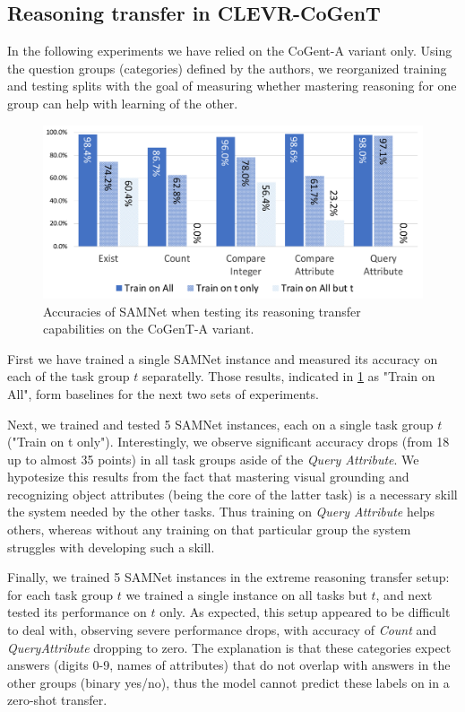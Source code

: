 \subsection{Reasoning transfer in CLEVR-CoGenT}
\label{sec:reasoning-transfer-clevr}
In the following experiments we have relied on the CoGent-A variant only.
Using the question groups (categories) defined by the authors, we reorganized training and testing splits with the goal of measuring whether mastering reasoning for one group can help with learning of the other.

\begin{figure}[htbp]
	\centering
	\includegraphics[width=\columnwidth]{../img/plots/cogent_reasoning_transfer.pdf}
	\caption{Accuracies of SAMNet when testing its reasoning transfer capabilities on the CoGenT-A variant.}
	\label{fig:cogent_reasoning_transfer}
\end{figure}

First we have trained a single SAMNet instance and measured its accuracy on each of the task group $t$ separatelly.
Those results, indicated in \cref{fig:cogent_reasoning_transfer} as "Train on All", form baselines for the next two sets of experiments.

Next, we trained and tested 5 SAMNet instances, each on a single task group $t$ ("Train on t only").
Interestingly, we observe significant accuracy drops (from 18 up to almost 35 points) in all task groups aside of the \textit{Query Attribute}.
We hypotesize this results from the fact that mastering visual grounding and recognizing object attributes (being the core of the latter task) is a necessary skill the system needed by the other tasks.
Thus training on \textit{Query Attribute} helps others, whereas without any training on that particular group the system struggles with developing such a skill.

Finally, we trained 5 SAMNet instances in the extreme reasoning transfer setup: for each task group $t$ we trained a single instance on all tasks but $t$, and next tested its performance on $t$ only.
As expected, this setup appeared to be difficult to deal with, observing severe performance drops, with accuracy of \textit{Count} and \textit{QueryAttribute} dropping to zero.
The explanation is that these categories expect  answers (digits 0-9, names of attributes) that do not overlap with answers in the other groups (binary yes/no), thus the model cannot predict these labels on in a zero-shot transfer.

